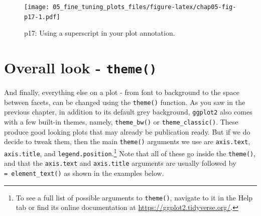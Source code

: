 \documentclass[
  12pt,
  krantz2]{krantz}
\makeatletter
\newenvironment{Shaded}{\begin{snugshade}}{\end{snugshade}}
\newcommand{\CommentTok}[1]{\textcolor[rgb]{0.56,0.35,0.01}{\textit{#1}}}
\newcommand{\DataTypeTok}[1]{\textcolor[rgb]{0.13,0.29,0.53}{#1}}
\newcommand{\DecValTok}[1]{\textcolor[rgb]{0.00,0.00,0.81}{#1}}
\newcommand{\FloatTok}[1]{\textcolor[rgb]{0.00,0.00,0.81}{#1}}
\newcommand{\KeywordTok}[1]{\textcolor[rgb]{0.13,0.29,0.53}{\textbf{#1}}}
\newcommand{\NormalTok}[1]{#1}
\newcommand{\OperatorTok}[1]{\textcolor[rgb]{0.81,0.36,0.00}{\textbf{#1}}}
\newcommand{\OtherTok}[1]{\textcolor[rgb]{0.56,0.35,0.01}{#1}}
\newcommand{\StringTok}[1]{\textcolor[rgb]{0.31,0.60,0.02}{#1}}
\newenvironment{kframe}{%
\medskip{}
\setlength{\fboxsep}{.8em}
 \def\at@end@of@kframe{}%
 \ifinner\ifhmode%
  \def\at@end@of@kframe{\end{minipage}}%
  \begin{minipage}{\columnwidth}%
 \fi\fi%
 \def\FrameCommand##1{\hskip\@totalleftmargin \hskip-\fboxsep
 \colorbox{shadecolor}{##1}\hskip-\fboxsep
     \hskip-\linewidth \hskip-\@totalleftmargin \hskip\columnwidth}%
 \MakeFramed {\advance\hsize-\width
   \@totalleftmargin\z@ \linewidth\hsize
   \@setminipage}}%
 {\par\unskip\endMakeFramed%
 \at@end@of@kframe}
\renewenvironment{Shaded}{\begin{kframe}}{\end{kframe}}
\makeatother
\begin{document}
\begin{Shaded}
\end{Shaded}

\begin{figure}
\centering
\texttt{[image: 05\_fine\_tuning\_plots\_files/figure-latex/chap05-fig-p17-1.pdf]}
\caption{\label{fig:chap05-fig-p17}p17: Using a superscript in your plot annotation.}
\end{figure}

\hypertarget{overall-look---theme}{%
\section{\texorpdfstring{Overall look - \texttt{theme()}}{Overall look - theme()}}\label{overall-look---theme}}

And finally, everything else on a plot - from font to background to the space between facets, can be changed using the \texttt{theme()} function.
As you saw in the previous chapter, in addition to its default grey background, \texttt{ggplot2} also comes with a few built-in themes, namely, \texttt{theme\_bw()} or \texttt{theme\_classic()}.
These produce good looking plots that may already be publication ready.
But if we do decide to tweak them, then the main \texttt{theme()} arguments we use are \texttt{axis.text}, \texttt{axis.title}, and \texttt{legend.position}.\footnote{To see a full list of possible arguments to \texttt{theme()}, navigate to it in the Help tab or find its online documentation at \url{https://ggplot2.tidyverse.org/}.}
Note that all of these go inside the \texttt{theme()}, and that the \texttt{axis.text} and \texttt{axis.title} arguments are usually followed by \texttt{=\ element\_text()} as shown in the examples below.
\end{document}
